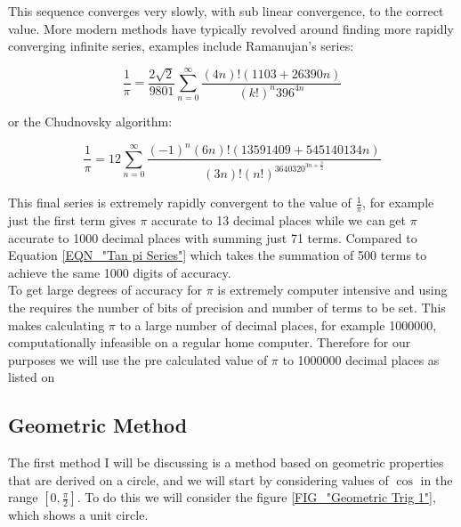 This sequence converges very slowly, with sub linear convergence, to the correct value. More modern methods have typically revolved around finding more rapidly converging infinite series, examples include Ramanujan's series\cite{ART_RamaPi}:

\begin{equation}
\frac{1}{\pi} = \frac{2\sqrt{2}}{9801}\sum_{n=0}^\infty \frac{(4n)!(1103 + 26390n)}{(k!)^n396^{4n}}
\end{equation}

or the Chudnovsky algorithm\cite{ART_ChudPi}:

\begin{equation}
\frac{1}{\pi} = 12\sum_{n=0}^\infty \frac{(-1)^n(6n)!(13591409 + 545140134n)}{(3n)!(n!)^3640320^{3n + \frac{3}{2}}}
\end{equation}

This final series is extremely rapidly convergent to the value of \(\frac{1}{\pi}\), for example just the first term gives \(\pi\) accurate to 13 decimal places while we can get \(\pi\) accurate to 1000 decimal places with summing just 71 terms. Compared to Equation \ref{EQN_"Tan pi Series"} which takes the summation of 500 terms to achieve the same 1000 digits of accuracy.\\

To get large degrees of accuracy for \(\pi\) is extremely computer intensive and using the  requires the number of bits of precision and number of terms to be set. This makes calculating \(\pi\) to a large number of decimal places, for example 1000000, computationally infeasible on a regular home computer. Therefore for our purposes we will use the pre calculated value of \(\pi\) to 1000000 decimal places as listed on \textcite{ONL_1MilPi}

\subsection{Geometric Method}
\label{SUB_"Trig Geometric Method"}

\theoremstyle{plain}
\newtheorem{Geo Trig Prop 1}{Proposition}[subsection]
\newtheorem{Geo Trig Prop 2}[Geo Trig Prop 1]{Proposition}
\newtheorem{Geo Trig Prop 3}[Geo Trig Prop 1]{Proposition}

The first method I will be discussing is a method based on geometric properties that are derived on a circle, and we will start by considering values of \(\cos\) in the range \([0, \frac{\pi}{2}]\). To do this we will consider the figure \ref{FIG_"Geometric Trig 1"}, which shows a unit circle.\\


